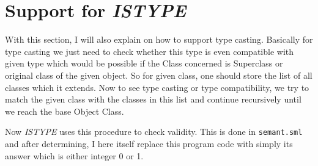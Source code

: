 \section{Support for \textit{ISTYPE}}

With this section, I will also explain on how to support type casting. Basically for type casting we just need to check whether this type is even compatible with given type which would be possible if the Class concerned is Superclass or original class of the given object. So for given class, one should store the list of all classes which it extends. Now to see type casting or type compatibility, we try to match the given class with the classes in this list and continue recursively until we reach the base Object Class.

Now \textit{ISTYPE} uses this procedure to check validity. This is done in \texttt{semant.sml} and after determining, I here itself replace this program code with simply its answer which is either integer 0 or 1.